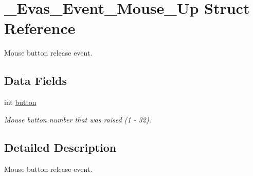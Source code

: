 \section{\_\-Evas\_\-Event\_\-Mouse\_\-Up Struct Reference}
\label{struct__Evas__Event__Mouse__Up}


Mouse button release event.  


\subsection*{Data Fields}
\begin{DoxyCompactItemize}
\item 
int \hyperlink{struct__Evas__Event__Mouse__Up_aa513164499624ee1e6f1790899efe60f}{button}\label{struct__Evas__Event__Mouse__Up_aa513164499624ee1e6f1790899efe60f}

\begin{DoxyCompactList}\small\item\em Mouse button number that was raised (1 -\/ 32). \item\end{DoxyCompactList}\end{DoxyCompactItemize}


\subsection{Detailed Description}
Mouse button release event. 